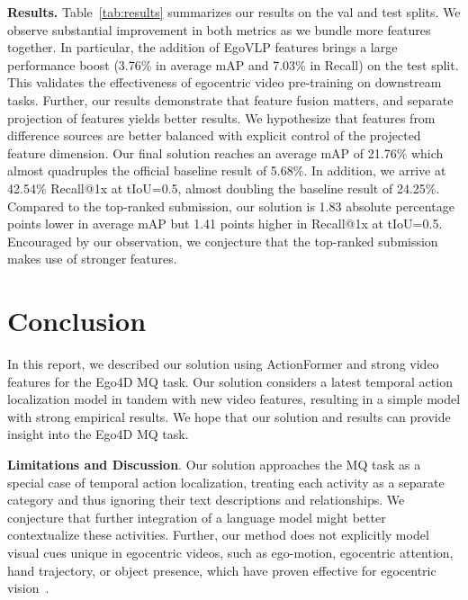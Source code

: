 \documentclass[runningheads]{llncs}
\begin{document}
\noindent \textbf{Results.} Table~\ref{tab:results} summarizes our results on the val and test splits. We observe substantial improvement in both metrics as we bundle more features together. In particular, the addition of EgoVLP features brings a large performance boost (3.76\% in average mAP and 7.03\% in Recall) on the test split. This validates the effectiveness of egocentric video pre-training on downstream tasks. Further, our results demonstrate that feature fusion matters, and separate projection of features yields better results. We hypothesize that features from difference sources are better balanced with explicit control of the projected feature dimension. Our final solution reaches an average mAP of 21.76\% which almost quadruples the official baseline result of 5.68\%. In addition, we arrive at 42.54\% Recall@1x at tIoU=0.5, almost doubling the baseline result of 24.25\%. Compared to the top-ranked submission, our solution is 1.83 absolute percentage points lower in average mAP but 1.41 points higher in Recall@1x at tIoU=0.5. Encouraged by our observation, we conjecture that the top-ranked submission makes use of stronger features.\smallskip

\section{Conclusion}

In this report, we described our solution using ActionFormer and strong video features for the Ego4D MQ task. Our solution considers a latest temporal action localization model in tandem with new video features, resulting in a simple model with strong empirical results. We hope that our solution and results can provide insight into the Ego4D MQ task.\smallskip 

\noindent \textbf{Limitations and Discussion}. Our solution approaches the MQ task as a special case of temporal action localization, treating each activity as a separate category and thus ignoring their text descriptions and relationships. We conjecture that further integration of a language model might better contextualize these activities. Further, our method does not explicitly model visual cues unique in egocentric videos, such as ego-motion, egocentric attention, hand trajectory, or object presence, which have proven effective for egocentric vision~\cite{li2021eye}. 




\end{document}
